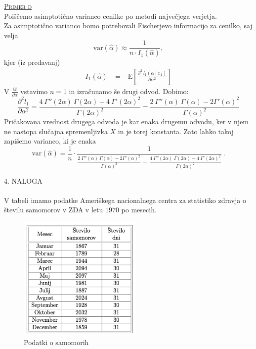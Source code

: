 \documentclass[a4paper,12pt]{article}
\begin{document}
\noindent
\textsc{\underline{Primer d}}
\\
Poiščemo asimptotično varianco cenilke po metodi največjega verjetja.
\\
Za asimptotično varianco bomo potrebovali Fischerjevo informacijo za cenilko, saj velja 
$$\text{var}(\hat{\alpha}) \approx \frac{1}{n \cdot I_1(\hat{\alpha})}, $$
kjer (iz predavanj) 
\begin{align}\label{en:fish}
    I_1(\hat{\alpha}) &= - \text{E} \left[ \frac{ \partial^2 \ l_1(\alpha \ | \ x_1)}{\partial \alpha^2} \right]
\end{align}
V $\frac{\partial l}{\partial \alpha}$ vstavimo $n = 1$ in izračunamo še drugi odvod. Dobimo:
$$ \frac{\partial^2 l_1}{\partial \alpha^2} = \frac{4 \ \Gamma '' (2 \alpha) \ \Gamma(2 \alpha) - 4 \ \Gamma' (2 \alpha)^2}{\Gamma (2 \alpha) ^2} - \frac{2 \ \Gamma '' (\alpha) \ \Gamma (\alpha) - 2 \Gamma ' (\alpha) ^ 2}{\Gamma (\alpha)^2}$$
Pričakovana vrednost drugega odvoda je kar enaka drugemu odvodu, ker v njem ne nastopa slučajna spremenljivka $X$ in je torej konstanta. Zato lahko takoj zapišemo varianco, ki je enaka
$$\text{var}(\hat{\alpha}) = \frac{1}{n} \cdot \frac{1}{ \frac{2 \ \Gamma '' (\alpha) \ \Gamma (\alpha) - 2 \Gamma ' (\alpha) ^ 2}{\Gamma (\alpha)^2} - \frac{4 \ \Gamma '' (2 \alpha) \ \Gamma(2 \alpha) - 4 \ \Gamma' (2 \alpha)^2}{\Gamma (2 \alpha) ^2} } \ .$$



\newpage
\noindent
\textsc{\large{4. NALOGA}}
\\
\\
V tabeli imamo podatke Ameriškega nacionalnega centra za statistiko zdravja o številu samomorov v ZDA v letu $1970$ po mesecih.

\begin{figure}[ht!]
    \centering
    \includegraphics[width=60mm]{samomori.png}
    \caption{Podatki o samomorih}
\end{figure}
\end{document}
